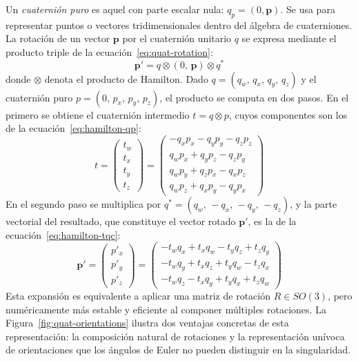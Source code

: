 Un \emph{cuaternión puro} es aquel con parte escalar nula: $q_p = (0, \mathbf{p})$.
Se usa para representar puntos o vectores tridimensionales dentro del álgebra
de cuaterniones. La rotación de un vector $\mathbf{p}$ por el cuaternión
unitario $q$ se expresa mediante el producto triple de la
ecuación~\ref{eq:quat-rotation}:
\begin{equation}
  \label{eq:quat-rotation}
  \mathbf{p}' = q \otimes (0,\,\mathbf{p}) \otimes q^*
\end{equation}
donde $\otimes$ denota el producto de Hamilton. Dado $q = (q_w,\, q_x,\, q_y,\, q_z)$
y el cuaternión puro $p = (0,\, p_x,\, p_y,\, p_z)$, el producto se computa
en dos pasos. En el primero se obtiene el cuaternión intermedio
$t = q \otimes p$, cuyos componentes son los de la
ecuación~\ref{eq:hamilton-qp}:
\begin{equation}
  \label{eq:hamilton-qp}
  t = \begin{pmatrix} t_w \\ t_x \\ t_y \\ t_z \end{pmatrix}
    = \begin{pmatrix}
        -q_x p_x - q_y p_y - q_z p_z \\
         q_w p_x + q_y p_z - q_z p_y \\
         q_w p_y + q_z p_x - q_x p_z \\
         q_w p_z + q_x p_y - q_y p_x
      \end{pmatrix}
\end{equation}
En el segundo paso se multiplica por $q^* = (q_w,\, -q_x,\, -q_y,\, -q_z)$, y
la parte vectorial del resultado, que constituye el vector rotado
$\mathbf{p}'$, es la de la ecuación~\ref{eq:hamilton-tqc}:
\begin{equation}
  \label{eq:hamilton-tqc}
  \mathbf{p}' = \begin{pmatrix} p'_x \\ p'_y \\ p'_z \end{pmatrix}
    = \begin{pmatrix}
        -t_w q_x + t_x q_w - t_y q_z + t_z q_y \\
        -t_w q_y + t_x q_z + t_y q_w - t_z q_x \\
        -t_w q_z - t_x q_y + t_y q_x + t_z q_w
      \end{pmatrix}
\end{equation}
Esta expansión es equivalente a aplicar una matriz de rotación
$R \in SO(3)$, pero numéricamente más estable y eficiente al componer
múltiples rotaciones. La Figura~\ref{fig:quat-orientations} ilustra dos
ventajas concretas de esta representación: la composición natural de
rotaciones y la representación unívoca de orientaciones que los ángulos de
Euler no pueden distinguir en la singularidad.

